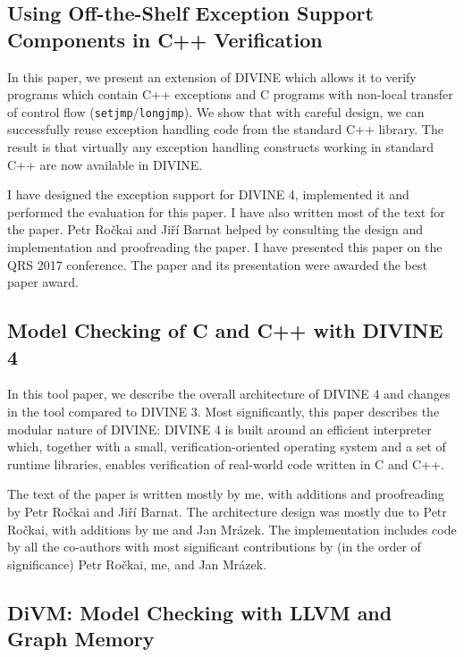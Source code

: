 \subsection*{Using Off-the-Shelf Exception Support Components in C++ Verification}

In this paper, we present an extension of DIVINE which allows it to verify programs which contain C++ exceptions and C programs with non-local transfer of control flow (\texttt{setjmp}/\texttt{longjmp}).
We show that with careful design, we can successfully reuse exception handling code from the standard C++ library.
The result is that virtually any exception handling constructs working in standard C++ are now available in DIVINE.

I have designed the exception support for DIVINE 4, implemented it and performed the evaluation for this paper.
I have also written most of the text for the paper.
Petr Ročkai and Jiří Barnat helped by consulting the design and implementation and proofreading the paper.
I have presented this paper on the QRS 2017 conference.
The paper and its presentation were awarded the best paper award.

\bigskip\noindent{}

\subsection*{Model Checking of C and C++ with DIVINE 4}

In this tool paper, we describe the overall architecture of DIVINE 4 and changes in the tool compared to DIVINE 3.
Most significantly, this paper describes the modular nature of DIVINE: DIVINE 4 is built around an efficient interpreter which, together with a small, verification-oriented operating system and a set of runtime libraries, enables verification of real-world code written in C and C++.

The text of the paper is written mostly by me, with additions and proofreading by Petr Ročkai and Jiří Barnat.
The architecture design was mostly due to Petr Ročkai, with additions by me and Jan Mrázek.
The implementation includes code by all the co-authors with most significant contributions by (in the order of significance) Petr Ročkai, me, and Jan Mrázek.

\bigskip\noindent{}

\subsection*{DiVM: Model Checking with LLVM and Graph Memory}

